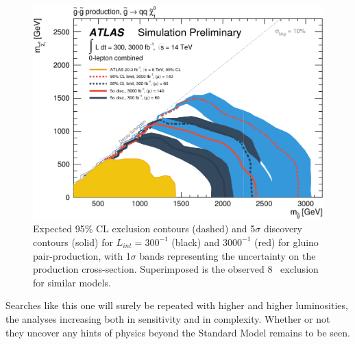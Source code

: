 \begin{figure}[!htb]
\centering
\includegraphics[width=.9\textwidth]{figures/interpretation/fig_09a.png}
\caption{ Expected 95\% \ac{CL} exclusion contours (dashed) and 5$\sigma$ discovery contours (solid) for $L_{int} = 300^{-1}$ (black) and $3000^{-1}$ (red) for gluino pair-production, with 1$\sigma$ bands representing the uncertainty on the production cross-section. Superimposed is the observed 8 \tev~exclusion for similar models. \cite{ATL-PHYS-PUB-2016-022}}
\label{fig:conc_hllhc}
\end{figure}

Searches like this one will surely be repeated with higher and higher luminosities, the analyses increasing both in sensitivity and in complexity. Whether or not they uncover any hints of physics beyond the Standard Model remains to be seen. 



